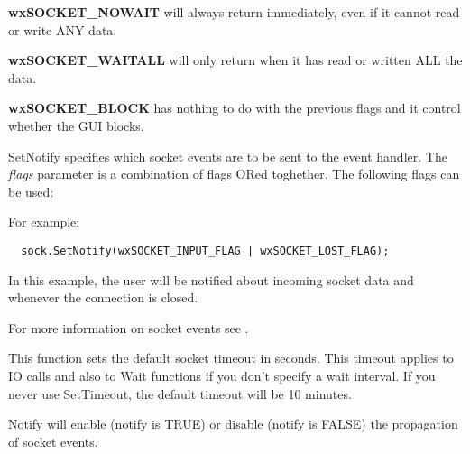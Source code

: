 {\bf wxSOCKET\_NOWAIT} will always return immediately, even if it cannot
read or write ANY data.

{\bf wxSOCKET\_WAITALL} will only return when it has read or written ALL
the data.

{\bf wxSOCKET\_BLOCK} has nothing to do with the previous flags and
it control whether the GUI blocks.

%
%
\label{wxsocketbasesetnotify}


SetNotify specifies which socket events are to be sent to the event handler.
The {\it flags} parameter is a combination of flags ORed toghether. The
following flags can be used:

\twocolwidtha{7cm}
\begin{twocollist}\itemsep=0pt
\end{twocollist}%

For example:

\begin{verbatim}
  sock.SetNotify(wxSOCKET_INPUT_FLAG | wxSOCKET_LOST_FLAG);
\end{verbatim}

In this example, the user will be notified about incoming socket data and
whenever the connection is closed.

For more information on socket events see .

%
%


This function sets the default socket timeout in seconds. This
timeout applies to IO calls and also to Wait functions if you
don't specify a wait interval. If you never use SetTimeout, the
default timeout will be 10 minutes.

%
%
\label{wxsocketbasenotify}


Notify will enable (notify is TRUE) or disable (notify is FALSE) the propagation
of socket events.

